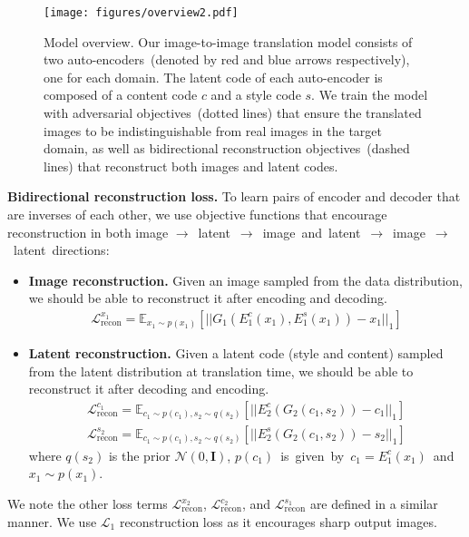 \documentclass[runningheads]{llncs}
\newcommand{\vpara}[1]{\vspace{0.05in}\noindent\textbf{#1}}
\begin{document}
	\begin{figure*}[!tb]
		\centering
		\texttt{[image: figures/overview2.pdf]}
\caption{Model overview. Our image-to-image translation model consists of two auto-encoders~(denoted by \textcolor{myred}{red} and \textcolor{myblue}{blue} arrows respectively), one for each domain. The latent code of each auto-encoder is composed of a content code $c$ and a style code $s$. We train the model with adversarial objectives~(dotted lines) that ensure the translated images to be indistinguishable from real images in the target domain, as well as bidirectional reconstruction objectives~(dashed lines) that reconstruct both images and latent codes. 
} 		
		\label{fig:overview}
\end{figure*}
	\vpara{Bidirectional reconstruction loss.} To learn pairs of encoder and decoder that are inverses of each other, we use objective functions that encourage reconstruction in both image \mbox{$\rightarrow$ latent $\rightarrow$ image and latent $\rightarrow$ image $\rightarrow$ latent directions}:
	\begin{itemize}[leftmargin=*]
		\item {\bf Image reconstruction.} Given an image sampled from the data distribution, we should be able to reconstruct it after encoding and decoding.
		\begin{align}
		\mathcal{L}^{x_{1}}_{\text{recon}} =\mathbb{E}_{x_{1}\sim p(x_{1})}[||G_{1}(E_{1}^{c}(x_{1}), E_{1}^{s}(x_{1}))-x_{1}||_{1}]
		\end{align}
		\item {\bf Latent reconstruction.} Given a latent code (style and content) sampled from the latent distribution at translation time, we should be able to reconstruct it after decoding and encoding.
		\begin{align}
		\mathcal{L}^{c_{1}}_{\text{recon}} = \mathbb{E}_{c_{1}\sim p(c_{1}), s_{2}\sim q(s_{2})}[||E^{c}_{2}(G_{2}(c_{1},s_{2}))-c_{1}||_{1}]\\
		\mathcal{L}^{s_{2}}_{\text{recon}} = \mathbb{E}_{c_{1}\sim p(c_{1}), s_{2}\sim q(s_{2})}[||E^{s}_{2}(G_{2}(c_{1},s_{2}))-s_{2}||_{1}]
		\end{align}
		where $q(s_{2})$ is the prior $\mathcal{N}(0, \mathbf{I})$, \mbox{$p(c_{1})$ is given by $c_{1} = E^{c}_{1}(x_{1})$ and $x_{1}\sim p(x_{1})$.}
	\end{itemize}
	We note the other loss terms $\mathcal{L}^{x_{2}}_{\text{recon}}$, $\mathcal{L}^{c_{2}}_{\text{recon}}$, and $\mathcal{L}^{s_{1}}_{\text{recon}}$ are defined in a similar manner. We use $\mathcal{L}_{1}$ reconstruction loss as it encourages sharp output images.
	
\end{document}
